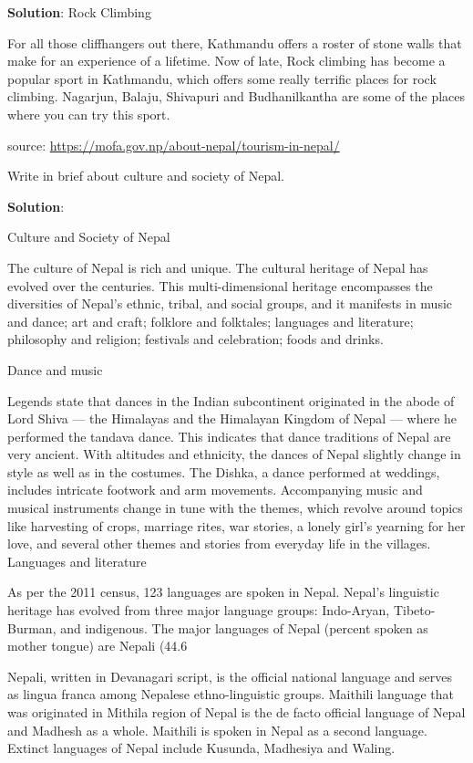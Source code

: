 \documentclass[
  openany]{book}
\newcommand{\question}{\item}
\newenvironment{solution}{ {\bfseries Solution}:}{}
\begin{document}
\begin{questions}
\begin{solution}
Rock Climbing

For all those cliffhangers out there, Kathmandu offers a roster of stone walls that make for an experience of a lifetime. Now of late, Rock climbing has become a popular sport in Kathmandu, which offers some really terrific places for rock climbing. Nagarjun, Balaju, Shivapuri and Budhanilkantha are some of the places where you can try this sport.

source: \url{https://mofa.gov.np/about-nepal/tourism-in-nepal/}
\end{solution}

\question Write in brief about culture and society of Nepal.

\begin{solution}

Culture and Society of Nepal

The culture of Nepal is rich and unique. The cultural heritage of Nepal has evolved over the centuries. This multi-dimensional heritage encompasses the diversities of Nepal’s ethnic, tribal, and social groups, and it manifests in music and dance; art and craft; folklore and folktales; languages and literature; philosophy and religion; festivals and celebration; foods and drinks.

Dance and music

Legends state that dances in the Indian subcontinent originated in the abode of Lord Shiva — the Himalayas and the Himalayan Kingdom of Nepal — where he performed the tandava dance. This indicates that dance traditions of Nepal are very ancient. With altitudes and ethnicity, the dances of Nepal slightly change in style as well as in the costumes. The Dishka, a dance performed at weddings, includes intricate footwork and arm movements. Accompanying music and musical instruments change in tune with the themes, which revolve around topics like harvesting of crops, marriage rites, war stories, a lonely girl’s yearning for her love, and several other themes and stories from everyday life in the villages.
Languages and literature

As per the 2011 census, 123 languages are spoken in Nepal. Nepal’s linguistic heritage has evolved from three major language groups: Indo-Aryan, Tibeto-Burman, and indigenous. The major languages of Nepal (percent spoken as mother tongue) are Nepali (44.6%

Nepali, written in Devanagari script, is the official national language and serves as lingua franca among Nepalese ethno-linguistic groups. Maithili language that was originated in Mithila region of Nepal is the de facto official language of Nepal and Madhesh as a whole. Maithili is spoken in Nepal as a second language. Extinct languages of Nepal include Kusunda, Madhesiya and Waling.


\end{solution}
\end{questions}
\end{document}
